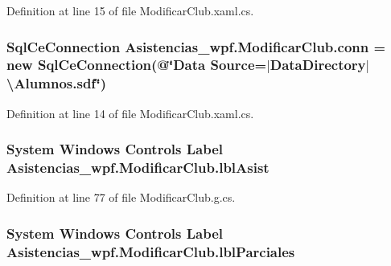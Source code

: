 Definition at line 15 of file Modificar\-Club.\-xaml.\-cs.

\hypertarget{class_asistencias__wpf_1_1_modificar_club_ad6c958505273f46077a11519363ddbe4}{
\subsubsection[{conn}]{\setlength{\rightskip}{0pt plus 5cm}Sql\-Ce\-Connection Asistencias\-\_\-wpf.\-Modificar\-Club.\-conn = new Sql\-Ce\-Connection(@\char`\"{}Data Source=$|$Data\-Directory$|$\textbackslash{}Alumnos.\-sdf\char`\"{})\hspace{0.3cm}{\ttfamily [private]}}}\label{class_asistencias__wpf_1_1_modificar_club_ad6c958505273f46077a11519363ddbe4}


Definition at line 14 of file Modificar\-Club.\-xaml.\-cs.

\hypertarget{class_asistencias__wpf_1_1_modificar_club_ac5bdd9fd539f35d3f2e5fbd928913db5}{
\subsubsection[{lbl\-Asist}]{\setlength{\rightskip}{0pt plus 5cm}System Windows Controls Label Asistencias\-\_\-wpf.\-Modificar\-Club.\-lbl\-Asist\hspace{0.3cm}{\ttfamily [package]}}}\label{class_asistencias__wpf_1_1_modificar_club_ac5bdd9fd539f35d3f2e5fbd928913db5}


Definition at line 77 of file Modificar\-Club.\-g.\-cs.

\hypertarget{class_asistencias__wpf_1_1_modificar_club_a898ac5359d41d715dbfb86b46a84a39f}{
\subsubsection[{lbl\-Parciales}]{\setlength{\rightskip}{0pt plus 5cm}System Windows Controls Label Asistencias\-\_\-wpf.\-Modificar\-Club.\-lbl\-Parciales\hspace{0.3cm}{\ttfamily [package]}}}\label{class_asistencias__wpf_1_1_modificar_club_a898ac5359d41d715dbfb86b46a84a39f}


